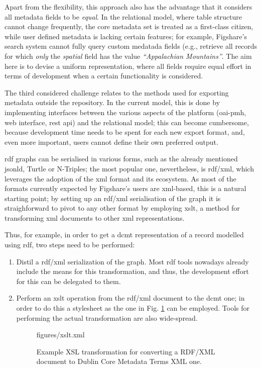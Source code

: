 Apart from the flexibility, this approach also has the advantage that it considers all metadata fields to be \emph{equal}. In the relational model, where table structure cannot change frequently, the core metadata set is treated as a first-class citizen, while user defined metadata is lacking certain features; for example, Figshare's search system cannot fully query custom medatada fields (e.g., retrieve all records for which \emph{only} the \emph{spatial} field has the value \emph{``Appalachian Mountains''}. The aim here is to devise a uniform representation, where all fields require equal effort in terms of development when a certain functionality is considered.

The third considered challenge relates to the methods used for exporting metadata outside the repository. In the current model, this is done by implementing interfaces between the various aspects of the platform (\gls{oai}-\gls{pmh}, web interface, \gls{rest} \gls{api}) and the relational model; this can become cumbersome, because development time needs to be spent for each new export format, and, even more important, users cannot define their own preferred output.

\gls{rdf} graphs can be serialised in various forms, such as the already mentioned \gls{jsonld}, Turtle or N-Triples; the most popular one, nevertheless, is \gls{rdf}/\gls{xml}, which leverages the adoption of the \gls{xml} format and its ecosystem. As most of the formats currently expected by Figshare's users are \gls{xml}-based, this is a natural starting point; by setting up an \gls{rdf}/\gls{xml} serialisation of the
graph it is straighforward to pivot to any other format by employing \gls{xslt}, a method for transforming \gls{xml} documents to other \gls{xml} representations.

Thus, for example, in order to get a \gls{dcmt} representation of a record modelled using \gls{rdf}, two steps need to be performed:

\begin{enumerate}
    \item Distil a \gls{rdf}/\gls{xml} serialization of the graph. Most \gls{rdf} tools nowadays already include the means for this transformation, and thus, the development effort for this can be delegated to them.
    \item Perform an \gls{xslt} operation from the \gls{rdf}/\gls{xml} document to the \gls{dcmt} one; in order to do this a stylesheet as the one in Fig. \ref{lst:xslt} can be employed. Tools for performing the actual transformation are also wide-spread.

\begin{figure}[!ht]

  {figures/xslt.xml}
  \caption{Example XSL transformation for converting a RDF/XML document to Dublin Core Metadata Terms XML one.}
  \label{lst:xslt}
\end{figure}
\end{enumerate}


